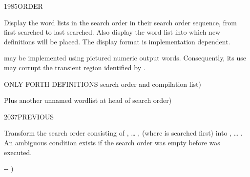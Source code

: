 \vspace*{-2ex}
\begin{worddef}{1985}{ORDER}
\item \stack{}{}

	Display the word lists in the search order in their search order
	sequence, from first searched to last searched. Also display the
	word list into which new definitions will be placed. The display
	format is implementation dependent.

	 may be implemented using pictured numeric output
	words. Consequently, its use may corrupt the transient region
	identified by .


	\begin{testing} %
		\ttfamily
		  ONLY FORTH DEFINITIONS search order and compilation list)  \\

		  Plus another unnamed wordlist at head of search order)  \\
	\end{testing}
\end{worddef}

\vspace*{-2ex}
\begin{worddef}{2037}{PREVIOUS}
\item \stack{}{}

	Transform the search order consisting of , {\ldots}
	,  (where  is searched
	first) into , {\ldots} . An ambiguous
	condition exists if the search order was empty before
	 was executed.

	\begin{implement} %
		\word{:}   -{}- )
			    
		\word{;}
	\end{implement}
\end{worddef}



